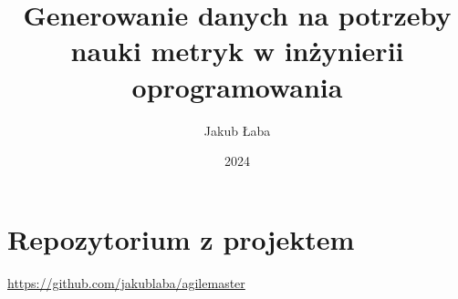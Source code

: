 \documentclass[thesis=inz,faculty=ee,oneside]{EE-dyplom}
\title{Generowanie danych na potrzeby nauki metryk w inżynierii oprogramowania}
\author{Jakub Łaba}
\date{2024}
\begin{document}
    \frontpages

    

    \bibliografia

    
    \appendix
    \section*{Repozytorium z projektem}
    \href{https://github.com/jakublaba/agilemaster}{https://github.com/jakublaba/agilemaster}
\end{document}
